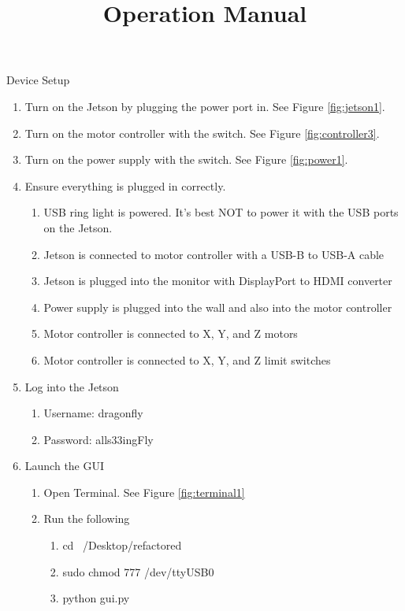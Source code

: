 \documentclass{article}
\title {Operation Manual}
\begin{document}
\maketitle
\begin{outline}[enumerate]

\1 {Device Setup}
\begin{enumerate}
	\item Turn on the Jetson by plugging the power port in. See Figure \ref{fig:jetson1}.
	\item Turn on the motor controller with the switch. See Figure \ref{fig:controller3}.
	\item Turn on the power supply with the switch. See Figure \ref{fig:power1}.
	\item Ensure everything is plugged in correctly. 
        \begin{enumerate}
        \item USB ring light is powered. It's best NOT to power it with the USB ports on the Jetson.
        \item Jetson is connected to motor controller with a USB-B to USB-A cable
        \item Jetson is plugged into the monitor with DisplayPort to HDMI converter
        \item Power supply is plugged into the wall and also into the motor controller
        \item Motor controller is connected to X, Y, and Z motors
        \item Motor controller is connected to X, Y, and Z limit switches
        \end{enumerate}
    \item Log into the Jetson
        \begin{enumerate}
        \item Username: dragonfly
        \item Password: alls33ingFly
        \end{enumerate}
    \item Launch the GUI
        \begin{enumerate}
        \item Open Terminal. See Figure \ref{fig:terminal1}
        \item Run the following
            \begin{enumerate}
                \item cd ~/Desktop/refactored
                \item sudo chmod 777 /dev/ttyUSB0
                \item python gui.py

\end{enumerate}
\end{enumerate}
\end{enumerate}
\end{outline}
\end{document}
